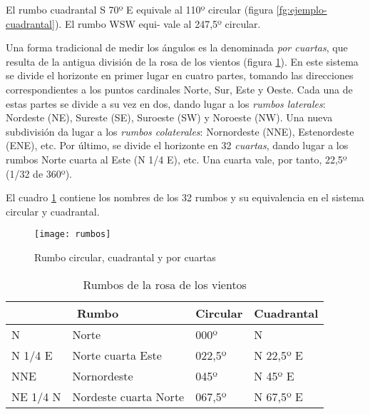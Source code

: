 \begin{ejemplo}
El rumbo cuadrantal S 70º E equivale al 110º circular (figura \ref{fg:ejemplo-cuadrantal}). El rumbo WSW equi- 
vale al 247,5º circular. 
\end{ejemplo}

Una forma tradicional de medir los ángulos es la denominada  \emph{por cuartas}, que resulta de la antigua división de la rosa de los vientos (figura \ref{fg:circular-cuadrantal}). En este sistema se divide el horizonte en primer lugar en cuatro partes, tomando las direcciones correspondientes a los puntos cardinales Norte, Sur, Este y Oeste. Cada una de estas partes se divide a su vez en dos, dando lugar a los \emph{rumbos laterales}: Nordeste (NE), Sureste (SE), Suroeste (SW) y Noroeste (NW). Una nueva subdivisión da lugar a los \emph{rumbos colaterales}: Nornordeste (NNE), Estenordeste (ENE), etc. Por último, se divide el horizonte en 32  \emph{cuartas}, dando lugar a los rumbos Norte cuarta al Este (N 1/4 E), etc. Una cuarta vale, por tanto, 22,5º (1/32 de 360º).

El cuadro \ref{tb:rumbos} contiene los nombres de los 32 rumbos y su equivalencia en el sistema circular y cuadrantal. 


\begin{figure}[tbp]
\begin{center}
\texttt{[image: rumbos]}\\
\caption{Rumbo circular, cuadrantal y por cuartas}
\label{fg:circular-cuadrantal}
\end{center}
\end{figure}

\begin{table}[htbp]
\caption{Rumbos de la rosa de los vientos}
\begin{center}
\begin{tabular}{llll}
\multicolumn{2}{c}{\textbf{Rumbo}} & \textbf{Circular} & \textbf{Cuadrantal} \\
\hline
N & Norte & 000º & N \\
N 1/4 E & Norte cuarta Este & 022,5º & N 22,5º E \\
NNE      & Nornordeste & 045º & N 45º E \\
NE 1/4 N & Nordeste cuarta Norte & 067,5º & N 67,5º E \\

\hline
\end{tabular}
\end{center}
\label{tb:rumbos}
\end{table}%



